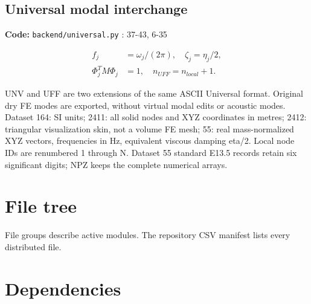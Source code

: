 \documentclass[10pt,a4paper]{article}
\newcommand{\loc}[1]{{\small\color{ink}\textbf{Code:} #1\par}}
\begin{document}
\begin{samepage}\subsection{Universal modal interchange}
\loc{\texttt{backend/universal.py} : 37-43, 6-35}
\begin{align}f_j&=\omega_j/(2\pi),\quad\zeta_j=\eta_j/2,\\\Phi_j^T M\Phi_j&=1,\quad n_{UFF}=n_{local}+1.\end{align}

UNV and UFF are two extensions of the same ASCII Universal format. Original dry FE modes are exported, without virtual modal edits or acoustic modes. Dataset 164: SI units; 2411: all solid nodes and XYZ coordinates in metres; 2412: triangular visualization skin, not a volume FE mesh; 55: real mass-normalized XYZ vectors, frequencies in Hz, equivalent viscous damping eta/2. Local node IDs are renumbered 1 through N. Dataset 55 standard E13.5 records retain six significant digits; NPZ keeps the complete numerical arrays.\par
\end{samepage}
\clearpage\section{File tree}

File groups describe active modules. The repository CSV manifest lists every distributed file.\par
\begin{center}\end{center}
\clearpage\section{Dependencies}
\end{document}
